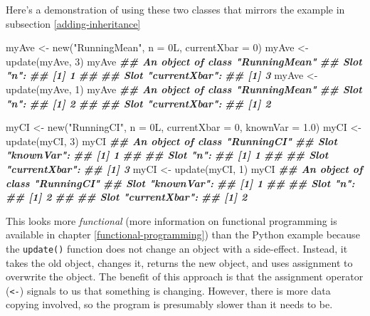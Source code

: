 \documentclass[
  12pt,
  krantz2]{krantz}
\makeatletter
\newenvironment{Shaded}{\begin{snugshade}}{\end{snugshade}}
\newcommand{\AttributeTok}[1]{\textcolor[rgb]{0.61,0.61,0.61}{#1}}
\newcommand{\DecValTok}[1]{\textcolor[rgb]{0.06,0.06,0.06}{#1}}
\newcommand{\DocumentationTok}[1]{\textcolor[rgb]{0.37,0.37,0.37}{\textbf{\textit{#1}}}}
\newcommand{\FloatTok}[1]{\textcolor[rgb]{0.06,0.06,0.06}{#1}}
\newcommand{\FunctionTok}[1]{\textcolor[rgb]{0,0,0}{#1}}
\newcommand{\NormalTok}[1]{#1}
\newcommand{\OtherTok}[1]{\textcolor[rgb]{0.37,0.37,0.37}{#1}}
\newcommand{\StringTok}[1]{\textcolor[rgb]{0.5,0.5,0.5}{#1}}
\newenvironment{kframe}{%
\medskip{}
\setlength{\fboxsep}{.8em}
 \def\at@end@of@kframe{}%
 \ifinner\ifhmode%
  \def\at@end@of@kframe{\end{minipage}}%
  \begin{minipage}{\columnwidth}%
 \fi\fi%
 \def\FrameCommand##1{\hskip\@totalleftmargin \hskip-\fboxsep
 \colorbox{shadecolor}{##1}\hskip-\fboxsep
     \hskip-\linewidth \hskip-\@totalleftmargin \hskip\columnwidth}%
 \MakeFramed {\advance\hsize-\width
   \@totalleftmargin\z@ \linewidth\hsize
   \@setminipage}}%
 {\par\unskip\endMakeFramed%
 \at@end@of@kframe}
\renewenvironment{Shaded}{\begin{kframe}}{\end{kframe}}
\makeatother
\begin{document}
Here's a demonstration of using these two classes that mirrors the example in subsection \ref{adding-inheritance}

\begin{Shaded}
\begin{Highlighting}[]
\NormalTok{myAve }\OtherTok{\textless{}{-}} \FunctionTok{new}\NormalTok{(}\StringTok{"RunningMean"}\NormalTok{, }\AttributeTok{n =}\NormalTok{ 0L, }\AttributeTok{currentXbar =} \DecValTok{0}\NormalTok{)}
\NormalTok{myAve }\OtherTok{\textless{}{-}} \FunctionTok{update}\NormalTok{(myAve, }\DecValTok{3}\NormalTok{)}
\NormalTok{myAve}
\DocumentationTok{\#\# An object of class "RunningMean"}
\DocumentationTok{\#\# Slot "n":}
\DocumentationTok{\#\# [1] 1}
\DocumentationTok{\#\# }
\DocumentationTok{\#\# Slot "currentXbar":}
\DocumentationTok{\#\# [1] 3}
\NormalTok{myAve }\OtherTok{\textless{}{-}} \FunctionTok{update}\NormalTok{(myAve, }\DecValTok{1}\NormalTok{)}
\NormalTok{myAve}
\DocumentationTok{\#\# An object of class "RunningMean"}
\DocumentationTok{\#\# Slot "n":}
\DocumentationTok{\#\# [1] 2}
\DocumentationTok{\#\# }
\DocumentationTok{\#\# Slot "currentXbar":}
\DocumentationTok{\#\# [1] 2}

\NormalTok{myCI }\OtherTok{\textless{}{-}} \FunctionTok{new}\NormalTok{(}\StringTok{"RunningCI"}\NormalTok{, }\AttributeTok{n =}\NormalTok{ 0L, }\AttributeTok{currentXbar =} \DecValTok{0}\NormalTok{, }\AttributeTok{knownVar =} \FloatTok{1.0}\NormalTok{)}
\NormalTok{myCI }\OtherTok{\textless{}{-}} \FunctionTok{update}\NormalTok{(myCI, }\DecValTok{3}\NormalTok{)}
\NormalTok{myCI}
\DocumentationTok{\#\# An object of class "RunningCI"}
\DocumentationTok{\#\# Slot "knownVar":}
\DocumentationTok{\#\# [1] 1}
\DocumentationTok{\#\# }
\DocumentationTok{\#\# Slot "n":}
\DocumentationTok{\#\# [1] 1}
\DocumentationTok{\#\# }
\DocumentationTok{\#\# Slot "currentXbar":}
\DocumentationTok{\#\# [1] 3}
\NormalTok{myCI }\OtherTok{\textless{}{-}} \FunctionTok{update}\NormalTok{(myCI, }\DecValTok{1}\NormalTok{)}
\NormalTok{myCI}
\DocumentationTok{\#\# An object of class "RunningCI"}
\DocumentationTok{\#\# Slot "knownVar":}
\DocumentationTok{\#\# [1] 1}
\DocumentationTok{\#\# }
\DocumentationTok{\#\# Slot "n":}
\DocumentationTok{\#\# [1] 2}
\DocumentationTok{\#\# }
\DocumentationTok{\#\# Slot "currentXbar":}
\DocumentationTok{\#\# [1] 2}
\end{Highlighting}
\end{Shaded}

This looks more \emph{functional} (more information on functional programming is available in chapter \ref{functional-programming}) than the Python example because the \texttt{update()} function does not change an object with a side-effect. Instead, it takes the old object, changes it, returns the new object, and uses assignment to overwrite the object. The benefit of this approach is that the assignment operator (\texttt{\textless{}-}) signals to us that something is changing. However, there is more data copying involved, so the program is presumably slower than it needs to be.
\end{document}
